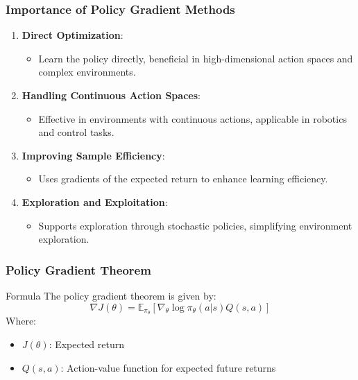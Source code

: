 \documentclass[aspectratio=169]{beamer}
\begin{document}
\begin{frame}[fragile]
    \frametitle{Importance of Policy Gradient Methods}
    \begin{enumerate}
        \item \textbf{Direct Optimization}:
            \begin{itemize}
                \item Learn the policy directly, beneficial in high-dimensional action spaces and complex environments.
            \end{itemize}
        
        \item \textbf{Handling Continuous Action Spaces}:
            \begin{itemize}
                \item Effective in environments with continuous actions, applicable in robotics and control tasks.
            \end{itemize}
        
        \item \textbf{Improving Sample Efficiency}:
            \begin{itemize}
                \item Uses gradients of the expected return to enhance learning efficiency.
            \end{itemize}
        
        \item \textbf{Exploration and Exploitation}:
            \begin{itemize}
                \item Supports exploration through stochastic policies, simplifying environment exploration.
            \end{itemize}
    \end{enumerate}
\end{frame}

\begin{frame}[fragile]
    \frametitle{Policy Gradient Theorem}
    \begin{block}{Formula}
        The policy gradient theorem is given by:
        \begin{equation}
            \nabla J(\theta) = \mathbb{E}_{\pi_\theta} \left[ \nabla_{\theta} \log \pi_\theta(a|s) Q(s,a) \right]
        \end{equation}
        Where:
        \begin{itemize}
            \item \( J(\theta) \): Expected return
            \item \( Q(s, a) \): Action-value function for expected future returns
        \end{itemize}
    \end{block}
\end{frame}
\end{document}
